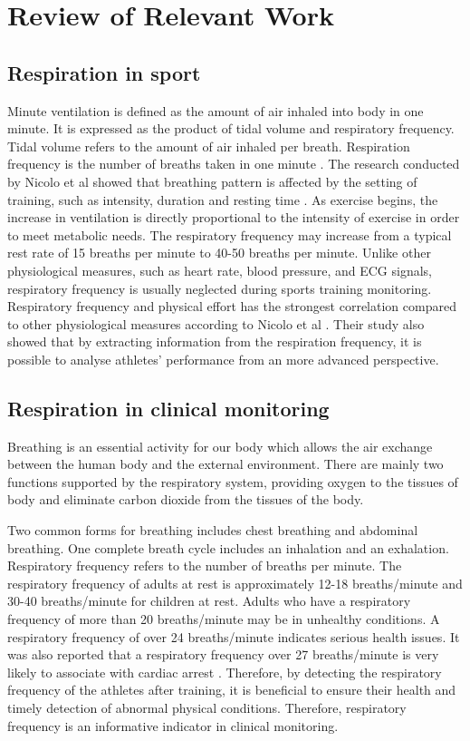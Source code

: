 \chapter{Review of Relevant Work}

\section{Respiration in sport}
Minute ventilation is defined as the amount of air inhaled into body in one minute. It is expressed as the product of tidal volume and respiratory frequency. Tidal volume refers to the amount of air inhaled per breath. Respiration frequency is the number of breaths taken in one minute \cite{Zuurbier2009MinuteStudy}. The research conducted by Nicolo et al showed that breathing pattern is affected by the setting of training, such as intensity, duration and resting time \cite{Nicolo2018RespiratoryInterdependence}. As exercise begins, the increase in ventilation is directly proportional to the intensity of exercise in order to meet metabolic needs. The respiratory frequency may increase from a typical rest rate of 15 breaths per minute to 40-50 breaths per minute. Unlike other physiological measures, such as heart rate, blood pressure, and ECG signals, respiratory frequency is usually neglected during sports training monitoring. Respiratory frequency and physical effort has the strongest correlation compared to other physiological measures according to Nicolo et al \cite{Nicolo2017RespiratoryMeasure}. Their study also showed that by extracting information from the respiration frequency, it is possible to analyse athletes' performance from an more advanced perspective.

\section{Respiration in clinical monitoring}
Breathing is an essential activity for our body which allows the air exchange between the human body and the external environment. There are mainly two functions supported by the respiratory system, providing oxygen to the tissues of body and eliminate carbon dioxide from the tissues of the body. 

Two common forms for breathing includes chest breathing and abdominal breathing. One complete breath cycle includes an inhalation and an exhalation. Respiratory frequency refers to the number of breaths per minute. The respiratory frequency of adults at rest is approximately 12-18 breaths/minute and 30-40 breaths/minute for children at rest. Adults who have a respiratory frequency of more than 20 breaths/minute may be in unhealthy conditions. A respiratory frequency of over 24 breaths/minute indicates serious health issues. It was also reported that a respiratory frequency over 27 breaths/minute is very likely to associate with cardiac arrest \cite{Cretikos2008OfMBA}.  Therefore, by detecting the respiratory frequency of the athletes after training, it is beneficial to ensure their health and timely detection of abnormal physical conditions. Therefore, respiratory frequency is an informative indicator in clinical monitoring.

